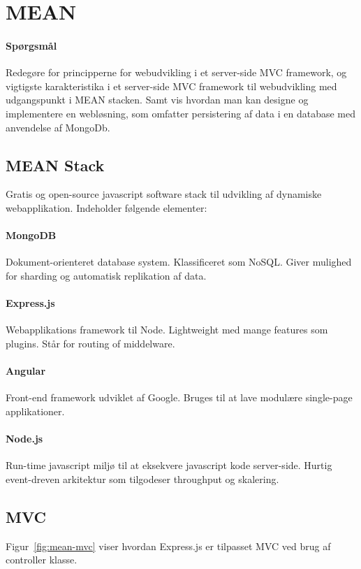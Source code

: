 \section{MEAN}

\paragraph{Spørgsmål}
Redegøre for principperne for webudvikling i et server-side MVC framework, og vigtigste karakteristika i et server-side	MVC framework til webudvikling med udgangspunkt i MEAN stacken. Samt vis hvordan man kan designe og implementere en	webløsning, som omfatter persistering af data i en database med anvendelse af MongoDb.

\subsection{MEAN Stack}
Gratis og open-source javascript software stack til udvikling af dynamiske webapplikation. Indeholder følgende elementer:

\paragraph{MongoDB} Dokument-orienteret database system. Klassificeret som NoSQL. Giver mulighed for sharding og automatisk replikation af data.

\paragraph{Express.js} Webapplikations framework til Node. Lightweight med mange features som plugins. Står for routing of middelware.

\paragraph{Angular} Front-end framework udviklet af Google. Bruges til at lave modulære single-page applikationer.

\paragraph{Node.js} Run-time javascript miljø til at eksekvere javascript kode server-side. Hurtig event-dreven arkitektur som tilgodeser throughput og skalering.

\subsection{MVC}
Figur~\ref{fig:mean-mvc} viser hvordan Express.js er tilpasset MVC ved brug af controller klasse.

